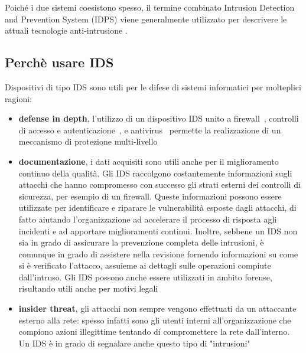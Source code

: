 \documentclass[../main.tex]{subfiles}
\begin{document}
Poiché i due sistemi coesistono spesso, il termine combinato Intrusion Detection and Prevention System (IDPS) viene generalmente utilizzato per descrivere le attuali tecnologie anti-intrusione \cite{IPS}.


\subsection{Perchè usare IDS}
Dispositivi di tipo IDS sono utili per le difese di sistemi informatici per molteplici ragioni:
\begin{itemize}
<<<<<<< HEAD
				\item \textbf{defense in depth}, l'utilizzo di un dispositivo IDS unito a firewall~\cite{idswithfirewall}, controlli di accesso e autenticazione~\cite{idswithacl}, e antivirus~\cite{idswithav} permette la realizzazione di un meccanismo di protezione multi-livello 
				\item \textbf{documentazione}, i dati acquisiti sono utili anche per il miglioramento continuo della qualità. Gli IDS raccolgono costantemente informazioni sugli attacchi che hanno compromesso con successo gli strati esterni dei controlli di sicurezza, per esempio di un firewall. Queste informazioni possono essere utilizzate per identificare e riparare le vulnerabilità esposte dagli attacchi, di fatto aiutando l'organizzazione ad accelerare il processo di risposta agli incidenti e ad apportare miglioramenti continui.
Inoltre, sebbene un IDS non sia in grado di assicurare la prevenzione completa delle intrusioni, è comunque in grado di assistere nella revisione fornendo informazioni su come si è verificato l'attacco, assuieme ai dettagli sulle operazioni compiute dall'intruso. Gli IDS possono anche essere utilizzati in ambito forense, risultando utili anche per motivi legali \cite{IPS}
				\item \textbf{insider threat}, gli attacchi non sempre vengono effettuati da un attaccante esterno alla rete: spesso infatti sono gli utenti interni all'organizzazione che compiono azioni illegittime tentando di compromettere la rete dall'interno. Un IDS è in grado di segnalare anche questo tipo di "intrusioni"~\cite{IPS}
\end{itemize}
\end{document}
